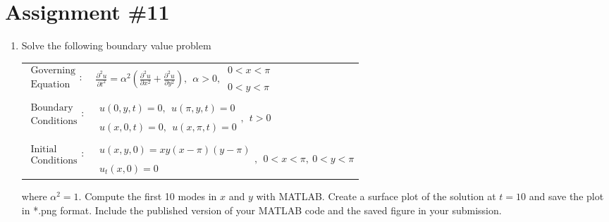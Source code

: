 \chapter{Assignment \#11}
\label{ch:ass11}
\begin{fullwidth}

\begin{enumerate}

\item Solve the following boundary value problem
\begin{table}
\begin{tabular}{l l}
$\substack{\text{Governing} \\\text{Equation}}: $& $\frac{\partial^2 u}{\partial t^2} = \alpha^2 \left(\frac{\partial^2 u}{\partial x^2}+ \frac{\partial^2 u}{\partial y^2}\right), \ \ \alpha > 0, \ \substack{0<x<\pi \\ \\ 0 < y < \pi }$ \\
& \\
$\substack{\text{Boundary} \\ \text{Conditions}}: $& $ \substack{u(0,y,t)=0, \ \ u(\pi,y,t) = 0 \\ \\ u(x,0,t) = 0, \ \ u(x,\pi,t) = 0}, \ \ t>0$\\
& \\
$\substack{\text{Initial} \\ \text{Conditions}}: $ & $ \substack{u(x,y,0) = xy(x-\pi)(y-\pi) \\ \\ u_{t}(x,0) = 0}, \ \ 0<x<\pi, \ 0<y<\pi $ \\
\end{tabular}
\end{table}

\vspace{0.1cm}

\noindent where $\alpha^2 = 1$. Compute the first 10 modes in $x$ and $y$ with MATLAB.  Create a surface plot of the solution at $t=10$ and save the plot in *.png format.  Include the published version of your MATLAB code and the saved figure in your submission.

\vspace{5.0cm}


\end{enumerate}
\end{fullwidth}

